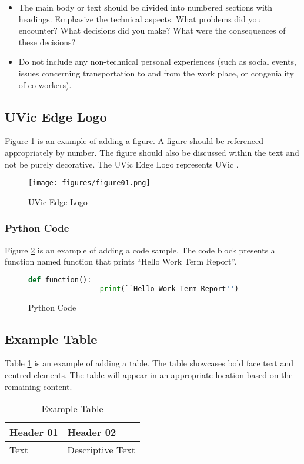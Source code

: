 \documentclass[12pt]{article}
\begin{document}
\begin{itemize}
  \item The main body or text should be divided into numbered sections with headings. Emphasize the technical aspects. What problems did you encounter? What decisions did you make? What were the consequences of these decisions?
  \item Do not include any non-technical personal experiences (such as social events, issues concerning transportation to and from the work place, or congeniality of co-workers).
\end{itemize}

\subsection{UVic Edge Logo}
Figure \ref{fig:figure01} is an example of adding a figure. A figure should be referenced appropriately by number. The figure should also be discussed within the text and not be purely decorative. The UVic Edge Logo represents UVic \cite{uvicwebsite}.
\vspace{0.75cm}

\begin{figure}[h!]
  \begin{center}
    \texttt{[image: figures/figure01.png]}
    \caption{UVic Edge Logo}
    \label{fig:figure01}
  \end{center}
\end{figure}

\subsubsection{Python Code}
Figure \ref{fig:figure02} is an example of adding a code sample. The code block presents a function named function that prints ``Hello Work Term Report''.

\begin{figure}[!ht]
  \begin{lstlisting}[language=Python]
                def function():
                 print(``Hello Work Term Report'')
            \end{lstlisting}
  \caption{Python Code}
  \label{fig:figure02}
\end{figure}

\subsection{Example Table}
Table \ref{table:table01} is an example of adding a table. The table showcases bold face text and centred elements. The table will appear in an appropriate location based on the remaining content.

\begin{table}[ht]
  \begin{center}
    \begin{tabular}{|l|l|}
      \hline
      \textbf{Header 01} & \textbf{Header 02} \\ \hline
      Text               & Descriptive Text   \\ \hline
    \end{tabular}
    \caption{Example Table}
    \label{table:table01}
  \end{center}
\end{table}
\end{document}
